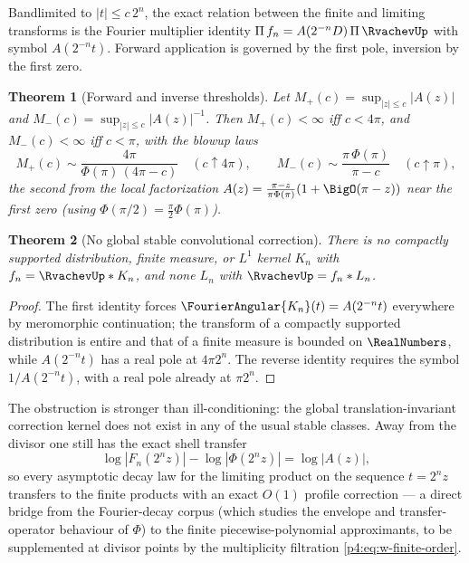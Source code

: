 \documentclass[11pt,oneside]{article}
\numberwithin{equation}{section}
\newtheorem{theorem}{Theorem}[section]
\theoremstyle{definition}
\theoremstyle{remark}
\begin{document}
Bandlimited to $|t|\le c\,2^n$, the exact relation between the finite and
limiting transforms is the Fourier multiplier identity
$\Pi\,f_n=A(2^{-n}D)\,\Pi\,\RvachevUp$ with symbol $A(2^{-n}t)$.  Forward
application is governed by the first pole, inversion by the first zero.

\begin{theorem}[Forward and inverse thresholds]
\label{p4:thm:w-conditioning}
Let $M_+(c)=\sup_{|z|\le c}|A(z)|$ and $M_-(c)=\sup_{|z|\le c}|A(z)|^{-1}$.
Then $M_+(c)<\infty$ iff $c<4\pi$, and $M_-(c)<\infty$ iff $c<\pi$, with
the blowup laws
\begin{equation}
 M_+(c)\sim\frac{4\pi}{\Phi(\pi)\,(4\pi-c)}
 \quad(c\uparrow4\pi),
 \qquad
 M_-(c)\sim\frac{\pi\,\Phi(\pi)}{\pi-c}
 \quad(c\uparrow\pi),
 \label{p4:eq:w-blowup}
\end{equation}
the second from the local factorization
$A(z)=\frac{\pi-z}{\pi\Phi(\pi)}(1+\BigO(\pi-z))$ near the first zero
(using $\Phi(\pi/2)=\tfrac\pi2\Phi(\pi)$).
\end{theorem}

\begin{theorem}[No global stable convolutional correction]
\label{p4:thm:w-deconvolution}
There is no compactly supported distribution, finite measure, or $L^1$
kernel $K_n$ with $f_n=\RvachevUp*K_n$, and none $L_n$ with $\RvachevUp=f_n*L_n$.
\end{theorem}

\begin{proof}
The first identity forces $\FourierAngular{K_n}(t)=A(2^{-n}t)$ everywhere by
meromorphic continuation; the transform of a compactly supported
distribution is entire and that of a finite measure is bounded on $\RealNumbers$,
while $A(2^{-n}t)$ has a real pole at $4\pi2^n$.  The reverse identity
requires the symbol $1/A(2^{-n}t)$, with a real pole already at $\pi2^n$.
\end{proof}

The obstruction is stronger than ill-conditioning: the global
translation-invariant correction kernel does not exist in any of the usual
stable classes.  Away from the divisor one still has the exact shell
transfer
\begin{equation}
 \log|F_n(2^nz)|-\log|\Phi(2^nz)|=\log|A(z)|,
 \label{p4:eq:w-shell-transfer}
\end{equation}
so every asymptotic decay law for the limiting product on the sequence
$t=2^nz$ transfers to the finite products with an exact $O(1)$ profile
correction --- a direct bridge from the Fourier-decay corpus (which studies
the envelope and transfer-operator behaviour of $\Phi$) to the finite
piecewise-polynomial approximants, to be supplemented at divisor points by
the multiplicity filtration \eqref{p4:eq:w-finite-order}.
\end{document}
